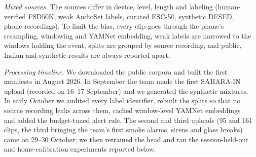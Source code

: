 \documentclass[conference,a4paper]{IEEEtran}
\begin{document}
\begin{table}[t]
\caption{Number of real clips for each class by source. Brackets give the test-split count, SAHARA-IN included; $^\dagger$ marks safety classes. The background row excludes 605 further DESED clips.}
\label{tab:data}
\centering\footnotesize
\setlength{\tabcolsep}{3pt}
\end{table}

\textit{Mixed sources.} The sources differ in device, level, length and labeling (human-verified FSD50K, weak AudioSet labels, curated ESC-50, synthetic DESED, phone recordings). To limit the bias, every clip goes through the phone's resampling, windowing and YAMNet embedding, weak labels are narrowed to the windows holding the event, splits are grouped by source recording, and public, Indian and synthetic results are always reported apart.

\textit{Processing timeline.} We downloaded the public corpora and built the first manifests in August 2026. In September the team made the first SAHARA-IN upload (recorded on 16--17 September) and we generated the synthetic mixtures. In early October we audited every label identifier, rebuilt the splits so that no source recording leaks across them, cached window-level YAMNet embeddings and added the budget-tuned alert rule. The second and third uploads (95 and 161 clips, the third bringing the team's first smoke alarms, sirens and glass breaks) came on 29--30 October; we then retrained the head and ran the session-held-out and home-calibration experiments reported below.
\end{document}

